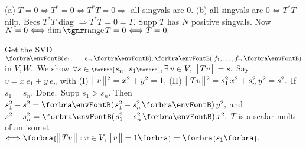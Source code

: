 %

\ChEnd\pagebreak


\vspace{6pt}

(a) $T=0\Longleftrightarrow T^*=0\Longleftrightarrow T^*T=0\Rightarrow$ all singvals are $0.$\parSol{}
(b) all singvals are $0\Longleftrightarrow T^*T$ nilp. Becs $T^*T$ diag $\Rightarrow T^*T=0=T.$\PfEnd\vspace{2pt}\parSol{}
\Or Supp $T$ has $N$ positive singvals. Now $N=0\Longleftrightarrow\dim\range T=0\Longleftrightarrow T=0.$\PfEnd
\SepLine

Get the SVD $\Par{e_1,\dots,e_m},\Par{\,f_1,\dots,f_m}$ in $V,W.$ \,We show $\forall s\in\Interval{[}{]}{s_n,\,s_1},\exists\,v\in V,\,\Dvert{Tv}=s.$\parSol{}
Say $v=x\:\!e_1+y\:\!e_n$ with (I) $\big\Vert\hspace{1pt}{}v{}\hspace{1pt}\big\Vert{\hspace{0.5pt}}{^2}=x^2+y^2=1,$ (II) $\big\Vert\hspace{1pt}{}Tv{}\hspace{1pt}\big\Vert{\hspace{0.5pt}}{^2}=s_1^2\,x^2+s_n^2\,y^2=s^2.$\parSol{}
If $s_1=s_n.$ Done. \,Supp $s_1>s_n.$ Then \,$s_1^2-s^2=\Par{s_1^2-s_n^2}\,y^2,$ and $s^2-s_n^2=\Par{s_1^2-s_n^2}\,x^2.$\PfEnd\vspace{2pt}
\AComm $T$ is a scalar multi of an isomet $\Longleftrightarrow\Bra{\Dvert{Tv}:v\in V,\Dvert{v}=1}=\Bra{s_1}.$
\SepLine

